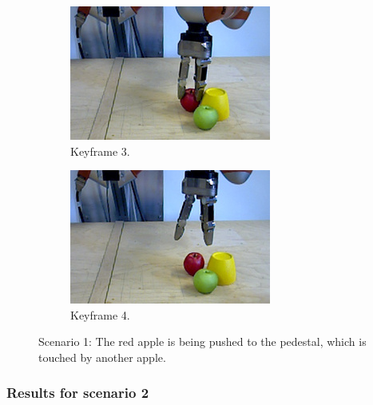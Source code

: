 \begin{figure}
\begin{subfigure}[t]{0.475\textwidth}
    \includegraphics[width=\textwidth]{./figures/sec/planning/exec1/frame0924.jpg}
    \caption{Keyframe 3.}
    \label{fig:sec_usingaffordanceforplanning_results_scenario1_3}
  \end{subfigure}
  \hfill
  \begin{subfigure}[t]{0.475\textwidth}
    \includegraphics[width=\textwidth]{./figures/sec/planning/exec1/frame1021.jpg}
    \caption{Keyframe 4.}
    \label{fig:sec_usingaffordanceforplanning_results_scenario1_4}
  \end{subfigure}
  \caption{Scenario 1: The red apple is being pushed to the pedestal, which is touched by another apple.}
  \label{fig:sec_usingaffordanceforplanning_results_scenario1}
\end{figure}





\subsubsection{Results for scenario 2}

